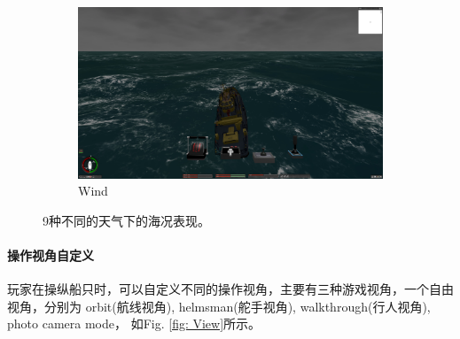 \documentclass[letterpaper,10pt]{article}
\begin{document}
\begin{figure}[ht]
					\begin{subfigure}{0.3\textwidth}
						\includegraphics[width=\linewidth]{picture/Wind}
						\captionsetup{font=scriptsize}
						\caption{Wind}
						\label{fig: Wind}
					\end{subfigure}
					\captionsetup{font=scriptsize}
					\caption{
						\label{fig: Weather}
						9种不同的天气下的海况表现。
					}
				\end{figure}
			
				\paragraph{操作视角自定义}
				
				玩家在操纵船只时，可以自定义不同的操作视角，主要有三种游戏视角，一个自由视角，分别为 orbit(航线视角), helmsman(舵手视角), walkthrough(行人视角), photo camera mode， 如Fig. \ref{fig: View}所示。
				
\end{document}
